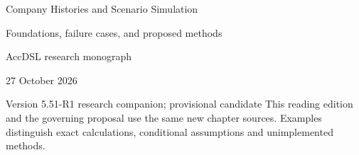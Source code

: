 \documentclass[11pt,a4paper]{report}
\begin{document}
\hypersetup{pageanchor=false}
\begin{titlepage}
{\Huge Company Histories and Scenario Simulation\par}
\vspace{12mm}
{\Large Foundations, failure cases, and proposed methods\par}
\vspace{8mm}
AccDSL research monograph\par 27 October 2026\par Version 5.51-R1 research companion; provisional candidate
\vfill
This reading edition and the governing proposal use the same new chapter sources. Examples distinguish exact calculations, conditional assumptions and unimplemented methods.
\end{titlepage}
\hypersetup{pageanchor=true}
\tableofcontents
\clearpage{}


























\clearpage\label{sim:body-end}

\begingroup\raggedright
\endgroup
\end{document}
